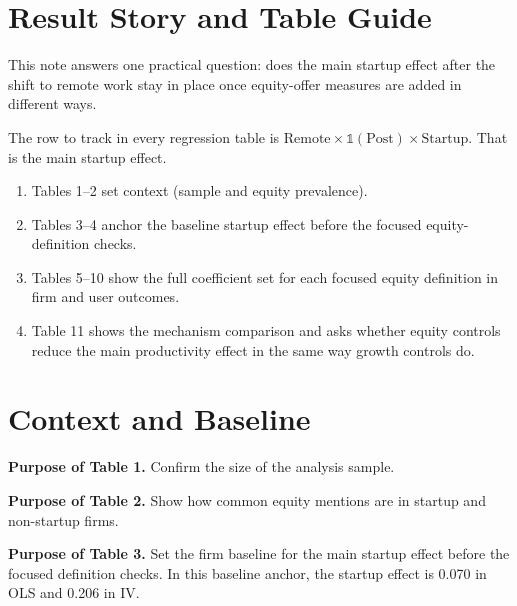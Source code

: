 \documentclass{article}
\newcommand{\cleanedresultsdir}{../results/cleaned/tex}
\newcommand{\TableInput}[2][\linewidth]{}
\begin{document}
\section*{Result Story and Table Guide}
This note answers one practical question: does the main startup effect after the shift to remote work stay in place once equity-offer measures are added in different ways.

\noindent The row to track in every regression table is
$ \text{Remote} \times \mathds{1}(\text{Post}) \times \text{Startup} $.
That is the main startup effect.

\begin{enumerate}
\item Tables 1--2 set context (sample and equity prevalence).
\item Tables 3--4 anchor the baseline startup effect before the focused equity-definition checks.
\item Tables 5--10 show the full coefficient set for each focused equity definition in firm and user outcomes.
\item Table 11 shows the mechanism comparison and asks whether equity controls reduce the main productivity effect in the same way growth controls do.
\end{enumerate}

\section*{Context and Baseline}
\noindent\textbf{Purpose of Table 1.} Confirm the size of the analysis sample.

\begin{table}[H]
  \centering
  \caption{Sample accounting}
  \TableInput{\cleanedresultsdir/llm_equity_pi_followups_anchor_sample.tex}
\end{table}

\noindent\textbf{Purpose of Table 2.} Show how common equity mentions are in startup and non-startup firms.

\begin{table}[H]
  \centering
  \caption{Startup vs non-startup equity prevalence}
  \TableInput{\cleanedresultsdir/llm_equity_pi_followups_anchor_descriptives.tex}
\end{table}

\noindent\textbf{Purpose of Table 3.} Set the firm baseline for the main startup effect before the focused definition checks.
In this baseline anchor, the startup effect is 0.070 in OLS and 0.206 in IV.
\end{document}
